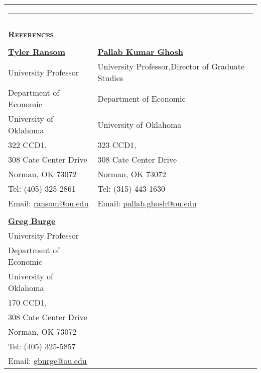 \documentclass[10pt,letterpaper]{article}
\begin{document}


\begin{tabular}{p{4.25 in}p{3.75in}}
	\multicolumn{2}{p{7.5in}}{\hrule}\\
	\\
	{\large \textsc{\textbf{\large{References}}}} &\\
	\\
	\href{https://tyleransom.github.io/}{\textbf{Tyler Ransom}}                      & \href{https://sites.google.com/site/pallabghoshou/}{\textbf{Pallab Kumar Ghosh}} \\
	University Professor                                                                              & University Professor,Director of Graduate Studies \\
	Department of Economic                                                             & Department of Economic  \\
	University of Oklahoma                                                                    & University of Oklahoma \\
	322 CCD1,                                                                                   & 323 CCD1, \\
	308 Cate Center Drive                                                                              & 308 Cate Center Drive  \\
	Norman, OK 73072                                                                              & Norman, OK 73072   \\
	Tel: (405) 325-2861                                                                          & Tel: (315) 443-1630 \\
	Email: \href{ransom@ou.edu}{ransom@ou.edu}                        & Email: \href{pallab.ghosh@ou.edu}{pallab.ghosh@ou.edu}  \\ \\
	
	
	
		\href{https://sites.create.ou.edu/gregburge1978/}{\textbf{Greg Burge}}                      & \\
	University Professor                                                                              &  \\
	Department of Economic                                                             & \\
	University of Oklahoma                                                                    & \\
	170 CCD1,                                                                                   & \\
	308 Cate Center Drive                                                                              &  \\
	Norman, OK 73072                                                                              &    \\
	Tel: (405) 325-5857                                                                         &  \\
	Email: \href{gburge@ou.edu}{gburge@ou.edu}                        &   \\
	

\end{tabular}
\end{document}

